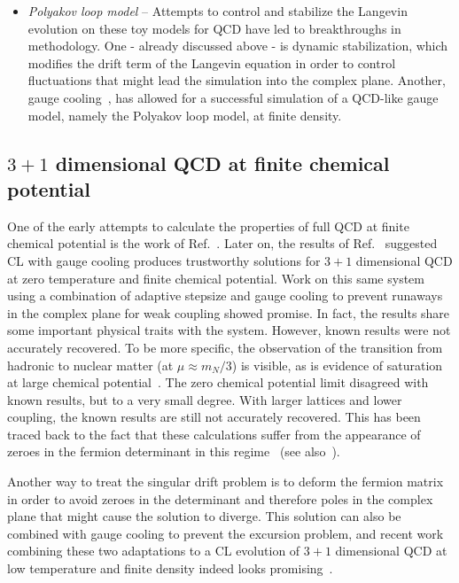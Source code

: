 \documentclass[../main.tex]{subfiles}
\begin{document}
\begin{itemize}
\item {\it Polyakov loop model} --
Attempts to control and stabilize the Langevin evolution on these toy models for QCD have led to breakthroughs in methodology. One - already discussed above - is dynamic stabilization, which modifies the drift term of the Langevin equation in order to control fluctuations that might lead the simulation into the complex plane. Another, gauge cooling~\cite{SeilerGaugeCooling, Bongiovanni:2013nxa, Bongiovanni:2014rna}, has allowed for a successful simulation of a QCD-like gauge model, namely the Polyakov loop model, at finite density.


\end{itemize}

\subsection{$3+1$ dimensional QCD at finite chemical potential}

One of the early attempts to calculate the properties of full QCD at finite chemical potential is the work of Ref.~\cite{Sexty:2013ica}.
Later on, the results of Ref.~\cite{Lattice2015KogutSinclair} suggested CL with gauge cooling produces trustworthy
solutions for $3+1$ dimensional QCD at zero temperature and finite chemical potential. Work on this same system using a
combination of adaptive stepsize and gauge cooling to prevent runaways in the complex plane for weak coupling showed
promise. In fact, the results share some important physical traits with the system. However, known results were not accurately
recovered. To be more specific, the observation of the transition from hadronic to nuclear matter (at $\mu \approx m_{N}/3$) is visible, as is
evidence of saturation at large chemical potential~\cite{LATTICE2016PROCSinclairKogut}. The zero chemical potential limit
disagreed with known results, but to a very small degree. With larger lattices and lower coupling, the known results are
still not accurately recovered. This has been traced back to the fact that these calculations suffer from
the appearance of zeroes in the fermion determinant in this regime~\cite{Lattice2017KogutSinclair} (see also~\cite{Sinclair:2018rbk, Kogut:2019qmi}).

Another way to treat the singular drift problem is to deform the fermion matrix in order to avoid zeroes in the
determinant and therefore poles in the complex plane that might cause the solution to diverge. This solution can also
be combined with gauge cooling to prevent the excursion problem, and recent work combining these two adaptations to
a CL evolution of $3+1$ dimensional QCD at low temperature and finite density indeed looks
promising~\cite{Nagata:2016alq, 2018EPJWC17507017N}.
\end{document}
